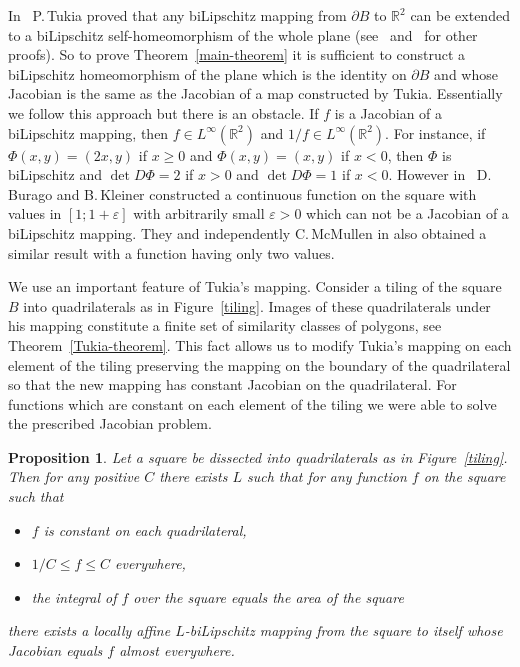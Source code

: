 \documentclass[12pt]{article}
\newtheorem{prop}{Proposition}[section]
\theoremstyle{definition}
\begin{document}
In~\cite{Tuk} P.\,Tukia proved that any biLipschitz mapping from $\partial B$ to $\mathbb R^2$ can be extended to a biLipschitz self-homeomorphism of the whole plane (see~\cite{DanPrat, JerKen, Tuk2} and~\cite[Theorem 7.9]{Pomm} for other proofs). So to prove Theorem~\ref{main-theorem} it is sufficient to construct a biLipschitz homeomorphism of the plane which is the identity on $\partial B$ and whose Jacobian is the same as the Jacobian of a map constructed by Tukia. Essentially we follow this approach but there is an obstacle. If $f$ is a Jacobian of a biLipschitz mapping, then $f\in L^{\infty}(\mathbb R^2)$ and $1/f \in L^{\infty}(\mathbb R^2).$ For instance, if $\Phi(x,y) = (2x, y)$ if $x\ge 0$ and $\Phi(x,y) = (x,y)$ if $x<0$, then $\Phi$ is biLipschitz and $\det D\Phi=2$ if $x>0$ and $\det D\Phi=1$ if $x<0.$ However in~\cite{BurKlei} D.\,Burago and B.\,Kleiner constructed a continuous function on the square with values in $[1;1+\varepsilon]$ with arbitrarily small $\varepsilon > 0$ which can not be a Jacobian of a biLipschitz mapping. They and independently C.\,McMullen in \cite{McM} also obtained a similar result with a function having only two values.

We use an important feature of Tukia's mapping. Consider a tiling of the square $B$ into quadrilaterals as in Figure~\ref{tiling}. Images of these quadrilaterals under his mapping constitute a finite set of similarity classes of polygons, see Theorem~\ref{Tukia-theorem}. This fact allows us to modify Tukia's mapping on each element of the tiling preserving the mapping on the boundary of the quadrilateral so that the new mapping has constant Jacobian on the quadrilateral. For functions which are constant on each element of the tiling we were able to solve the prescribed Jacobian problem.

\begin{prop}
\label{jacobian-problem}
Let a square be dissected into quadrilaterals as in Figure~\ref{tiling}. Then for any positive $C$ there exists $L$ such that for any function $f$ on the square such that
\begin{itemize}
\item $f$ is constant on each quadrilateral,
\item $1/C \le f \le C$ everywhere,
\item the integral of $f$ over the square equals the area of the square
\end{itemize}
there exists a locally affine $L$-biLipschitz mapping from the square to itself whose Jacobian equals $f$ almost everywhere.
\end{prop}
\end{document}
